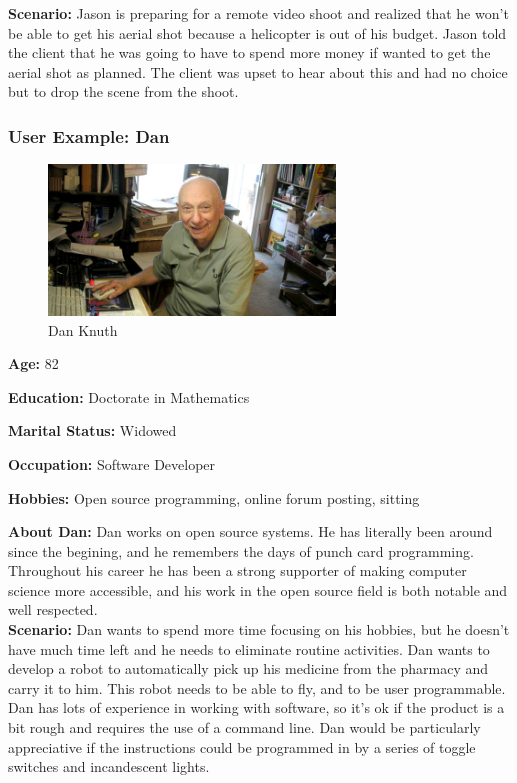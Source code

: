 \documentclass[english]{article}
\numberwithin{equation}{section} %
\begin{document}
\textbf{Scenario:} Jason is preparing for a remote video shoot and realized that he won't be able to get his aerial shot because a helicopter is out of his budget. Jason told the client that he was going to have to spend more money if wanted to get the aerial shot as planned. The client was upset to hear about this and had no choice but to drop the scene from the shoot. %

\newpage
\subsubsection{User Example: Dan}

\begin{figure}[h!]
  \centering
	\includegraphics[width=3in]{oldgradstudent.jpg}
  \caption{Dan Knuth}
\end{figure}
\textbf{ Age:} 82

\textbf{ Education:} Doctorate in Mathematics

\textbf{ Marital Status:} Widowed

\textbf{ Occupation:} Software Developer

\textbf{ Hobbies:} Open source programming, online forum posting, sitting

\textbf{About Dan:} Dan works on open source systems. He has literally been around since the begining, and he remembers the days of punch card programming. Throughout his career he has been a strong supporter of making computer science more accessible, and his work in the open source field is both notable and well respected.
\\
\textbf{Scenario:} Dan wants to spend more time focusing on his hobbies, but he doesn't have much time left and he needs to eliminate routine activities. Dan wants to develop a robot to automatically pick up his medicine from the pharmacy and carry it to him. This robot needs to be able to fly, and to be user programmable. Dan has lots of experience in working with software, so it's ok if the product is a bit rough and requires the use of a command line. Dan would be particularly appreciative if the instructions could be programmed in by a series of toggle switches and incandescent lights.
\end{document}
